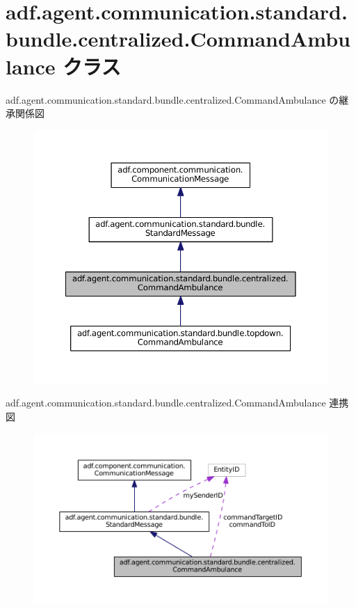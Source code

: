 \hypertarget{classadf_1_1agent_1_1communication_1_1standard_1_1bundle_1_1centralized_1_1CommandAmbulance}{}\section{adf.\+agent.\+communication.\+standard.\+bundle.\+centralized.\+Command\+Ambulance クラス}
\label{classadf_1_1agent_1_1communication_1_1standard_1_1bundle_1_1centralized_1_1CommandAmbulance}


adf.\+agent.\+communication.\+standard.\+bundle.\+centralized.\+Command\+Ambulance の継承関係図
\nopagebreak
\begin{figure}[H]
\begin{center}
\leavevmode
\includegraphics[width=350pt]{classadf_1_1agent_1_1communication_1_1standard_1_1bundle_1_1centralized_1_1CommandAmbulance__inherit__graph}
\end{center}
\end{figure}


adf.\+agent.\+communication.\+standard.\+bundle.\+centralized.\+Command\+Ambulance 連携図
\nopagebreak
\begin{figure}[H]
\begin{center}
\leavevmode
\includegraphics[width=350pt]{classadf_1_1agent_1_1communication_1_1standard_1_1bundle_1_1centralized_1_1CommandAmbulance__coll__graph}
\end{center}
\end{figure}
